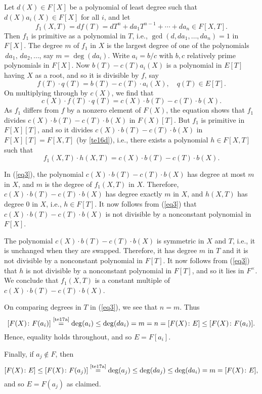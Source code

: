 \documentclass[a4paper,11pt,final,openany]{memoir}
\theoremstyle{nonumberplain}
\begin{document}
Let $d(X)\in F[X]$ be a polynomial of least degree such that $d(X)a_{i}(X)\in
F[X]$ for all $i$, and let%
\[
f_{1}(X,T)=df(T)=dT^{n}+da_{1}T^{n-1}+\cdots+da_{n}\in F[X,T].
\]
Then $f_{1}$ is primitive as a polynomial in $T$, i.e., $\gcd(d,da_{1}%
,\ldots,da_{n})=1$ in $F[X]$. The degree $m$ of $f_{1}$ in $X$ is the largest
degree of one of the polynomials $\,da_{1},\,da_{2},\ldots$, say
$m=\deg(da_{i})$. Write $a_{i}=b/c$ with $b,c$ relatively prime polynomials in
$F[X]$. Now $b(T)-c(T)a_{i}(X)$ is a polynomial in $E[T]$ having $X$ as a
root, and so it is divisible by $f$, say%
\[
f(T)\cdot q(T)=b(T)-c(T)\cdot a_{i}(X),\quad q(T)\in E[T]\text{.}%
\]
On multiplying through by $c(X)$, we find that%
\[
c(X)\cdot f(T)\cdot q(T)=c(X)\cdot b(T)-c(T)\cdot b(X).
\]
As $f_{1}$ differs from $f$ by a nonzero element of $F(X)$, the equation shows
that $f_{1}$ divides $c(X)\cdot b(T)-c(T)\cdot b(X)$ in $F(X)[T]$. But $f_{1}$
is primitive in $F[X][T]$, and so it divides $c(X)\cdot b(T)-c(T)\cdot b(X)$
in $F[X][T]=F[X,T]$ (by \ref{te16d}), i.e., there exists a polynomial $h\in
F[X,T]$ such that%
\begin{equation}
f_{1}(X,T)\cdot h(X,T)=c(X)\cdot b(T)-c(T)\cdot b(X)\text{.} \label{eq3}%
\end{equation}


In (\ref{eq3}), the polynomial $c(X)\cdot b(T)-c(T)\cdot b(X)$ has degree at
most $m$ in $X$, and $m$ is the degree of $f_{1}(X,T)$ in $X$. Therefore,
$c(X)\cdot b(T)-c(T)\cdot b(X)$ has degree exactly $m$ in $X$, and $h(X,T)$
has degree $0$ in $X$, i.e., $h\in F[T]$. It now follows from (\ref{eq3}) that
$c(X)\cdot b(T)-c(T)\cdot b(X)$ is not divisible by a nonconstant polynomial
in $F[X]$.

The polynomial $c(X)\cdot b(T)-c(T)\cdot b(X)$ is symmetric in $X$ and $T$,
i.e., it is unchanged when they are swapped. Therefore, it has degree $m$ in
$T$ and it is not divisible by a nonconstant polynomial in $F[T]$. It now
follows from (\ref{eq3}) that $h$ is not divisible by a nonconstant polynomial
in $F[T]$, and so it lies in $F^{\times}$. We conclude that $f_{1}(X,T)$ is a
constant multiple of $c(X)\cdot b(T)-c(T)\cdot b(X)$.

On comparing degrees in $T$ in (\ref{eq3}), we see that $n=m$. Thus%
\[
\lbrack F(X)\colon F(a_{i})]\overset{\text{\ref{te17a}}}{=}\deg(a_{i})\leq
\deg(da_{i})=m=n=[F(X)\colon E]\leq\lbrack F(X)\colon F(a_{i})].
\]
Hence, equality holds throughout, and so $E=F[a_{i}]$.

Finally, if $a_{j}\notin F$, then%
\[
\lbrack F(X)\colon E]\leq\lbrack F(X)\colon F(a_{j}%
)]\overset{\text{\ref{te17a}}}{=}\deg(a_{j})\leq\deg(da_{j})\leq\deg
(da_{i})=m=[F(X)\colon E],
\]
and so $E=F(a_{j})$ as claimed.
\end{document}
